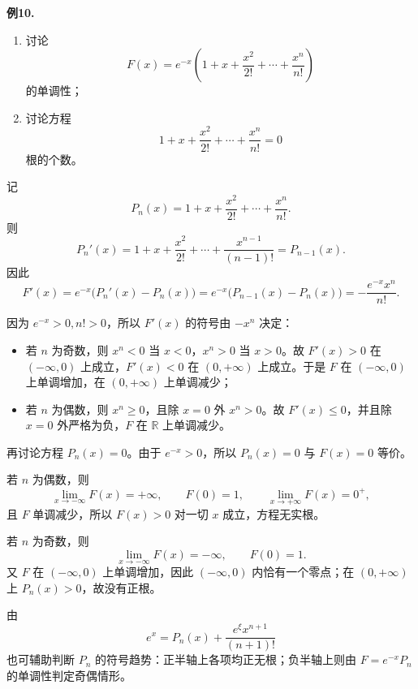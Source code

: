 \begin{problemblock}
\textbf{例10.} 
\begin{enumerate}[label=(\arabic*), leftmargin=2.2em]
\item 讨论
\[
F(x)=e^{-x}\left(1+x+\frac{x^2}{2!}+\cdots+\frac{x^n}{n!}\right)
\]
的单调性；
\item 讨论方程
\[
1+x+\frac{x^2}{2!}+\cdots+\frac{x^n}{n!}=0
\]
根的个数。
\end{enumerate}
\end{problemblock}
\begin{solutionblock}
记
\[
P_n(x)=1+x+\frac{x^2}{2!}+\cdots+\frac{x^n}{n!}.
\]
则
\[
P_n'(x)=1+x+\frac{x^2}{2!}+\cdots+\frac{x^{n-1}}{(n-1)!}=P_{n-1}(x).
\]
因此
\[
F'(x)=e^{-x}\bigl(P_n'(x)-P_n(x)\bigr)
=e^{-x}\bigl(P_{n-1}(x)-P_n(x)\bigr)
=-\frac{e^{-x}x^n}{n!}.
\]

因为 \(e^{-x}>0,n!>0\)，所以 \(F'(x)\) 的符号由 \(-x^n\) 决定：
\begin{itemize}
  \item 若 \(n\) 为奇数，则 \(x^n<0\) 当 \(x<0\)，\(x^n>0\) 当 \(x>0\)。故 \(F'(x)>0\) 在 \((-\infty,0)\) 上成立，\(F'(x)<0\) 在 \((0,+\infty)\) 上成立。于是 \(F\) 在 \((-\infty,0)\) 上单调增加，在 \((0,+\infty)\) 上单调减少；
  \item 若 \(n\) 为偶数，则 \(x^n\ge0\)，且除 \(x=0\) 外 \(x^n>0\)。故 \(F'(x)\le0\)，并且除 \(x=0\) 外严格为负，\(F\) 在 \(\mathbb R\) 上单调减少。
\end{itemize}

再讨论方程 \(P_n(x)=0\)。由于 \(e^{-x}>0\)，所以 \(P_n(x)=0\) 与 \(F(x)=0\) 等价。

若 \(n\) 为偶数，则
\[
\lim_{x\to-\infty}F(x)=+\infty,\qquad F(0)=1,\qquad \lim_{x\to+\infty}F(x)=0^+,
\]
且 \(F\) 单调减少，所以 \(F(x)>0\) 对一切 \(x\) 成立，方程无实根。

若 \(n\) 为奇数，则
\[
\lim_{x\to-\infty}F(x)=-\infty,\qquad F(0)=1.
\]
又 \(F\) 在 \((-\infty,0)\) 上单调增加，因此 \((-\infty,0)\) 内恰有一个零点；在 \((0,+\infty)\) 上 \(P_n(x)>0\)，故没有正根。

由
\[
e^x=P_n(x)+\frac{e^\xi x^{n+1}}{(n+1)!}
\]
也可辅助判断 \(P_n\) 的符号趋势：正半轴上各项均正无根；负半轴上则由 \(F=e^{-x}P_n\) 的单调性判定奇偶情形。
\end{solutionblock}
